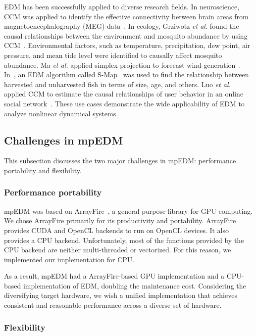\documentclass[conference]{IEEEtran}
\begin{document}
EDM has been successfully applied to diverse research fields. In neuroscience,
CCM was applied to identify the effective connectivity between brain areas from
magnetoencephalography (MEG) data~\cite{Natsukawa2017}. In ecology, Grziwotz
\emph{et al.} found the causal relationships between the environment and
mosquito abundance by using CCM~\cite{grziwotz2018empirical}. Environmental
factors, such as temperature, precipitation, dew point, air pressure, and mean
tide level were identified to causally affect mosquito abundance. Ma \emph{et
al.} applied simplex projection to forecast wind generation~\cite{ma2017ultra}.
In~\cite{anderson2008fishing}, an EDM algorithm called
S-Map~\cite{sugihara1994nonlinear} was used to find the relationship between
harvested and unharvested fish in terms of size, age, and others. Luo \emph{et
al.} applied CCM to estimate the causal relationships of user behavior in an
online social network~\cite{luo2014causal}. These use cases demonstrate the wide
applicability of EDM to analyze nonlinear dynamical systems.

\subsection{Challenges in mpEDM}\label{sec:challenges}

This subsection discusses the two major challenges in mpEDM: performance
portability and flexibility.

\subsubsection{Performance portability}

mpEDM was based on ArrayFire~\cite{Malcolm2012}, a general purpose library for
GPU computing. We chose ArrayFire primarily for its productivity and
portability. ArrayFire provides CUDA and OpenCL backends to run on OpenCL
devices. It also provides a CPU backend. Unfortunately, most of the functions
provided by the CPU backend are neither multi-threaded or vectorized. For this
reason, we implemented our implementation for CPU\@.

As a result, mpEDM had a ArrayFire-based GPU implementation and a CPU-based
implementation of EDM, doubling the maintenance cost. Considering the
diversifying target hardware, we wish a unified implementation that achieves
consistent and reasonable performance across a diverse set of hardware.

\subsubsection{Flexibility}
\end{document}
